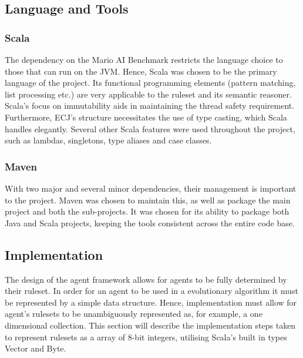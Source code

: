 
\subsection{Language and Tools}

\subsubsection{Scala}
\label{subsec:langchoice}
The dependency on the Mario AI Benchmark restricts the language choice to those that can run on the JVM. Hence, Scala was chosen to be the primary language of the project. Its functional programming elements (pattern matching, list processing etc.) are very applicable to the ruleset and its semantic reasoner. Scala's focus on immutability aids in maintaining the thread safety requirement. Furthermore, ECJ's structure necessitates the use of type casting, which Scala handles elegantly. Several other Scala features were used throughout the project, such as lambdas, singletons, type aliases and case classes. 

\subsubsection{Maven}
With two major and several minor dependencies, their management is important to the project. Maven was chosen to maintain this, as well as package the main project and both the sub-projects. It was chosen for its ability to package both Java and Scala projects, keeping the tools consistent across the entire code base.



\subsection{Implementation}

The design of the agent framework allows for agents to be fully determined by their ruleset. In order for an agent to be used in a evolutionary algorithm it must be represented by a simple data structure. Hence, implementation must allow for agent's rulesets to be unambiguously represented as, for example, a one dimensional collection. This section will describe the implementation steps taken to represent rulesets as a array of 8-bit integers, utilising Scala's built in types Vector and Byte.

